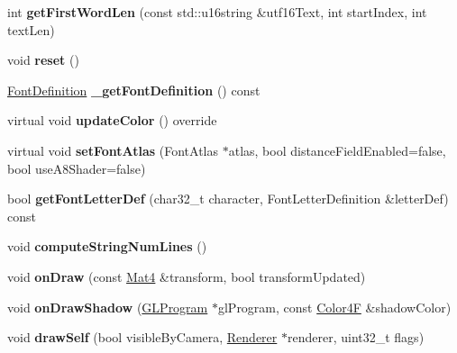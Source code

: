 \begin{DoxyCompactItemize}
\mbox{\label{classLabel_a99c741fe75902e8c722396c57c07b83e}} 
int {\bfseries get\+First\+Word\+Len} (const std\+::u16string \&utf16\+Text, int start\+Index, int text\+Len)
\item 
\mbox{\label{classLabel_a6653f9b3efc57ca65e4c92b9eb6dbb46}} 
void {\bfseries reset} ()
\item 
\mbox{\label{classLabel_ad908702d3a30e4a4d808ce74ff804694}} 
\hyperlink{structFontDefinition}{Font\+Definition} {\bfseries \+\_\+get\+Font\+Definition} () const
\item 
\mbox{\label{classLabel_a070279d35949c3aca66876387ef7aee7}} 
virtual void {\bfseries update\+Color} () override
\item 
\mbox{\label{classLabel_a5072d6f6975344efc3e766f993e9a12c}} 
virtual void {\bfseries set\+Font\+Atlas} (Font\+Atlas $\ast$atlas, bool distance\+Field\+Enabled=false, bool use\+A8\+Shader=false)
\item 
\mbox{\label{classLabel_a79a3360a7d49885dbed18eec4af65c6e}} 
bool {\bfseries get\+Font\+Letter\+Def} (char32\+\_\+t character, Font\+Letter\+Definition \&letter\+Def) const
\item 
\mbox{\label{classLabel_af513e8218b4b1c925ad1535dcf7bbb43}} 
void {\bfseries compute\+String\+Num\+Lines} ()
\item 
\mbox{\label{classLabel_a330e5f6af913a07491ca3387b42f1745}} 
void {\bfseries on\+Draw} (const \hyperlink{classMat4}{Mat4} \&transform, bool transform\+Updated)
\item 
\mbox{\label{classLabel_af364c295c196c5918b95e150f1b417da}} 
void {\bfseries on\+Draw\+Shadow} (\hyperlink{classGLProgram}{G\+L\+Program} $\ast$gl\+Program, const \hyperlink{structColor4F}{Color4F} \&shadow\+Color)
\item 
\mbox{\label{classLabel_a915ef0f16a9b4629945407e2e4b70e34}} 
void {\bfseries draw\+Self} (bool visible\+By\+Camera, \hyperlink{classRenderer}{Renderer} $\ast$renderer, uint32\+\_\+t flags)
\item 

\end{DoxyCompactItemize}
